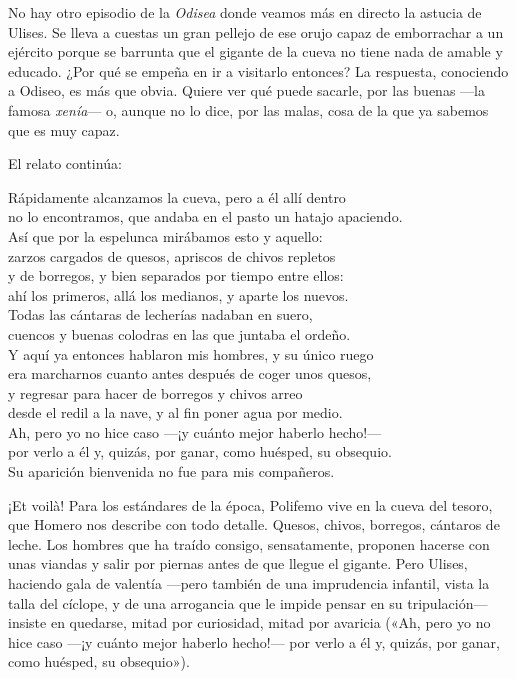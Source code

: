 No hay otro episodio de la \emph{Odisea} donde veamos más en directo la astucia de Ulises. Se lleva a cuestas un gran pellejo de ese orujo capaz de emborrachar a un ejército porque se barrunta que el gigante de la cueva no tiene nada de amable y educado. ¿Por qué se empeña en ir a visitarlo entonces? La respuesta, conociendo a Odiseo, es más que obvia. Quiere ver qué puede sacarle, por las buenas ---la famosa \emph{xenía}--- o, aunque no lo dice, por las malas, cosa de la que ya sabemos que es muy capaz.

El relato continúa:

\begin{versocita}
Rápidamente alcanzamos la cueva, pero a él allí dentro\\
no lo encontramos, que andaba en el pasto un hatajo apaciendo.\\
Así que por la espelunca mirábamos esto y aquello:\\
zarzos cargados de quesos, apriscos de chivos repletos\\
y de borregos, y bien separados por tiempo entre ellos:\\
ahí los primeros, allá los medianos, y aparte los nuevos.\\
Todas las cántaras de lecherías nadaban en suero,\\
cuencos y buenas colodras en las que juntaba el ordeño.\\
Y aquí ya entonces hablaron mis hombres, y su único ruego\\
era marcharnos cuanto antes después de coger unos quesos,\\
y regresar para hacer de borregos y chivos arreo\\
desde el redil a la nave, y al fin poner agua por medio.\\
Ah, pero yo no hice caso ---¡y cuánto mejor haberlo hecho!---\\
por verlo a él y, quizás, por ganar, como huésped, su obsequio.\\
Su aparición bienvenida no fue para mis compañeros.
\end{versocita}

¡Et voilà! Para los estándares de la época, Polifemo vive en la cueva del tesoro, que Homero nos describe con todo detalle. Quesos, chivos, borregos, cántaros de leche. Los hombres que ha traído consigo, sensatamente, proponen hacerse con unas viandas y salir por piernas antes de que llegue el gigante. Pero Ulises, haciendo gala de valentía ---pero también de una imprudencia infantil, vista la talla del cíclope, y de una arrogancia que le impide pensar en su tripulación--- insiste en quedarse, mitad por curiosidad, mitad por avaricia («Ah, pero yo no hice caso ---¡y cuánto mejor haberlo hecho!--- por verlo a él y, quizás, por ganar, como huésped, su obsequio»).

